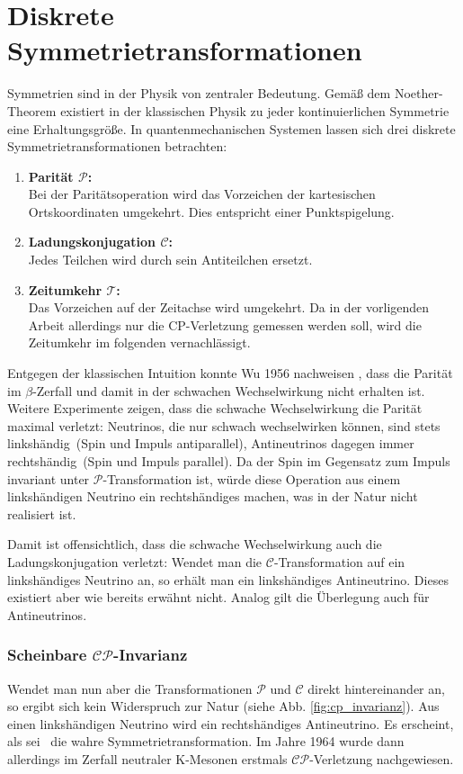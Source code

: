 \section{Diskrete Symmetrietransformationen}
Symmetrien sind in der Physik von zentraler Bedeutung. Gemäß dem Noether-Theorem existiert in der klassischen Physik zu jeder kontinuierlichen Symmetrie eine Erhaltungsgröße. In quantenmechanischen Systemen lassen sich drei diskrete Symmetrietransformationen betrachten:
\begin{enumerate}
\item \textbf{Parität $\mathcal{P}$:} \\
      Bei der Paritätsoperation wird das Vorzeichen der kartesischen Ortskoordinaten umgekehrt. Dies entspricht einer Punktspigelung.
\item \textbf{Ladungskonjugation $\mathcal{C}$:} \\
      Jedes Teilchen wird durch sein Antiteilchen ersetzt.
\item \textbf{Zeitumkehr $\mathcal{T}$:} \\
      Das Vorzeichen auf der Zeitachse wird umgekehrt. Da in der vorligenden Arbeit allerdings nur die CP-Verletzung gemessen werden soll, wird die Zeitumkehr im folgenden vernachlässigt.
\end{enumerate}
Entgegen der klassischen Intuition konnte Wu 1956 nachweisen \cite{wu-experiment}, dass die Parität im $\beta$-Zerfall und damit in der schwachen Wechselwirkung nicht erhalten ist. Weitere Experimente zeigen, dass die schwache Wechselwirkung die Parität maximal verletzt: Neutrinos, die nur schwach wechselwirken können, sind stets \glqq linkshändig\grqq\ (Spin und Impuls antiparallel), Antineutrinos dagegen immer \glqq rechtshändig\grqq\ (Spin und Impuls parallel). Da der Spin im Gegensatz zum Impuls invariant unter $\mathcal{P}$-Transformation ist, würde diese Operation aus einem linkshändigen Neutrino ein rechtshändiges machen, was in der Natur nicht realisiert ist.

Damit ist offensichtlich, dass die schwache Wechselwirkung auch die Ladungskonjugation verletzt: Wendet man die $\mathcal{C}$-Transformation auf ein linkshändiges Neutrino an, so erhält man ein linkshändiges Antineutrino. Dieses existiert aber wie bereits erwähnt nicht. Analog gilt die Überlegung auch für Antineutrinos.

\subsubsection{Scheinbare $\mathcal{CP}$-Invarianz}
Wendet man nun aber die Transformationen $\mathcal{P}$ und $\mathcal{C}$ direkt hintereinander an, so ergibt sich kein Widerspruch zur Natur (siehe Abb. \ref{fig:cp_invarianz}). Aus einen linkshändigen Neutrino wird ein rechtshändiges Antineutrino. Es erscheint, als sei \CP\ die wahre Symmetrietransformation. Im Jahre 1964 wurde dann allerdings im Zerfall neutraler K-Mesonen erstmals $\mathcal{CP}$-Verletzung nachgewiesen. \cite{kleinknecht}

